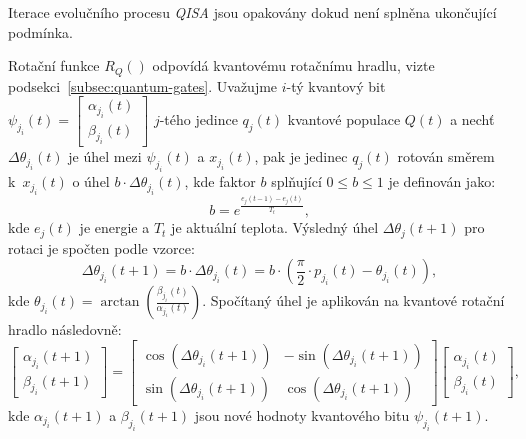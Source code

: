 Iterace evolučního procesu \emph{QISA} jsou opakovány dokud není splněna ukončující podmínka.

Rotační funkce $R_Q\left(\right)$ odpovídá kvantovému rotačnímu hradlu, vizte podsekci~\ref{subsec:quantum-gates}. 
Uvažujme $i$-tý kvantový bit $\psi_{j_i}\left(t\right) = \begin{bmatrix} \alpha_{j_i}\left(t\right) \\ \beta_{j_i}\left(t\right) \end{bmatrix}$ $j$-tého jedince $q_j\left(t\right)$ kvantové populace $Q\left(t\right)$ a nechť $\Delta\theta_{j_i}\left(t\right)$ je úhel mezi $\psi_{j_i}\left(t\right)$ a $x_{j_i}\left(t\right)$, pak je jedinec $q_j\left(t\right)$ rotován směrem k~$x_{j_i}\left(t\right)$ o úhel $b \cdot \Delta\theta_{j_i}\left(t\right)$, kde faktor $b$ splňující $0 \leq b \leq 1$ je definován jako:
\begin{equation}\label{eq:b-factor}
    b = e^{\frac{e_j\left(t-1\right) - e_j\left(t\right)}{T_t}}, 
\end{equation}
kde $e_j\left(t\right)$ je energie a $T_t$ je aktuální teplota. Výsledný úhel $\Delta\theta_j\left(t+1\right)$ pro rotaci je spočten podle vzorce:
\begin{equation*}
        \Delta\theta_{j_i}\left(t+1\right) = b \cdot \Delta\theta_{j_i}\left(t\right) = b \cdot \left(\frac{\pi}{2}\cdot p_{j_i}\left(t\right) - \theta_{j_i}\left(t\right)\right),
\end{equation*}
kde $\theta_{j_i}\left(t\right) = \arctan{\left(\frac{\beta_{j_i}\left(t\right)}{\alpha_{j_i}\left(t\right)}\right)}$. 
Spočítaný úhel je aplikován na kvantové rotační hradlo následovně:
\begin{equation*}
    \begin{bmatrix}
        \alpha_{j_i}\left(t+1\right) \\
        \beta_{j_i}\left(t+1\right)
    \end{bmatrix}
    =
    \begin{bmatrix}
        \cos{\left( \Delta\theta_{j_i}\left(t+1\right) \right)} & - \sin{\left( \Delta\theta_{j_i}\left(t+1\right) \right)} \\
        \sin{\left( \Delta\theta_{j_i}\left(t+1\right) \right)} &   \cos{\left( \Delta\theta_{j_i}\left(t+1\right) \right)}
    \end{bmatrix}
    \begin{bmatrix}
        \alpha_{j_i}\left(t\right) \\
        \beta_{j_i}\left(t\right) 
    \end{bmatrix},
\end{equation*}
kde $\alpha_{j_i}\left(t+1\right)$ a $\beta_{j_i}\left(t+1\right)$ jsou nové hodnoty kvantového bitu $\psi_{j_i}\left(t+1\right)$.

